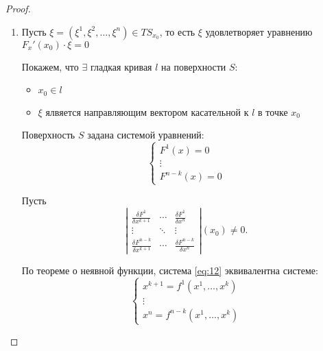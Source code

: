\begin{proof}
\begin{enumerate}
        \item Пусть $\xi = (\xi^1,\xi^2,\ldots,\xi^n) \in TS_{x_0}$, то есть $\xi$ удовлетворяет уравнению $F_x'(x_0)\cdot \xi = 0$

              Покажем, что $\exists$ гладкая кривая $l$ на поверхности $S$:
              \begin{itemize}
                  \item $x_0 \in l$
                  \item $\xi$ ялвяется направляющим вектором касательной к $l$ в точке $x_0$
              \end{itemize}

              Поверхность $S$ задана системой уравнений:
              \begin{equation}\label{eq:12}
                  \left\{\begin{array}{l}
                      F^1(x) = 0 \\
                      \vdots     \\
                      F^{n-k}(x) = 0
                  \end{array}\right.
              \end{equation}

              Пусть
              \begin{equation*}
                  \left|\begin{matrix}
                      \frac{\delta F^1}{\delta x^{k+1}}     & \cdots & \frac{\delta F^1}{\delta x^n}     \\
                      \vdots                                & \ddots & \vdots                            \\
                      \frac{\delta F^{n-k}}{\delta x^{k+1}} & \cdots & \frac{\delta F^{n-k}}{\delta x^n}
                  \end{matrix}\right| (x_0) \ne 0.
              \end{equation*}

              По теореме о неявной функции, система \ref{eq:12} эквивалентна системе:
              \begin{equation}\label{eq:13}
                  \left\{\begin{array}{l}
                      x^{k+1} = f^1(x^1,\ldots,x^k) \\
                      \vdots                        \\
                      x^n = f^{n-k}(x^1,\ldots,x^k)
                  \end{array}\right.
              \end{equation}


\end{enumerate}
\end{proof}

